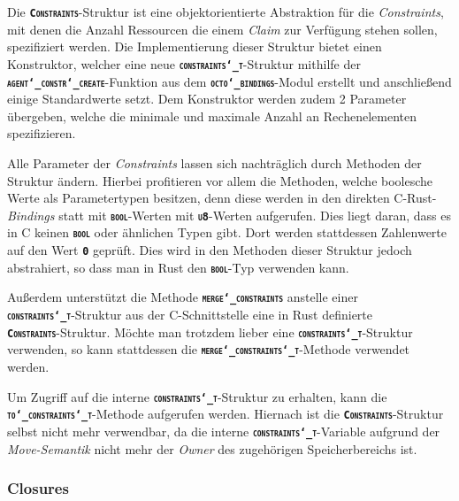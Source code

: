 Die \texttt{\textsc{\textbf{Constraints}}}-Struktur ist eine
objektorientierte Abstraktion für die \textit{Constraints}, mit denen die Anzahl Ressourcen
die einem \textit{Claim} zur Verfügung stehen sollen, spezifiziert werden.
Die Implementierung dieser Struktur bietet einen Konstruktor, welcher eine neue
\texttt{\textsc{\textbf{constraints\char`_t}}}-Struktur mithilfe der
\texttt{\textsc{\textbf{agent\char`_constr\char`_create}}}-Funktion aus dem
\texttt{\textsc{\textbf{octo\char`_bindings}}}-Modul erstellt und anschließend einige Standardwerte setzt. 
Dem Konstruktor werden zudem 2 Parameter übergeben,
welche die minimale und maximale Anzahl an Rechenelementen spezifizieren.

Alle Parameter der \textit{Constraints} lassen sich nachträglich durch Methoden der Struktur ändern.
Hierbei profitieren vor allem die Methoden, welche boolesche Werte als Parametertypen besitzen,
denn diese werden in den direkten C-Rust-\textit{Bindings} statt mit \texttt{\textsc{\textbf{bool}}}-Werten mit
\texttt{\textsc{\textbf{u8}}}-Werten aufgerufen. Dies liegt daran, dass es in C keinen
\texttt{\textsc{\textbf{bool}}} oder ähnlichen Typen gibt. Dort werden stattdessen Zahlenwerte auf den
Wert \texttt{\textsc{\textbf{0}}} geprüft. Dies wird in den Methoden dieser Struktur jedoch abstrahiert,
so dass man in Rust den \texttt{\textsc{\textbf{bool}}}-Typ verwenden kann.

Außerdem unterstützt die Methode \texttt{\textsc{\textbf{merge\char`_constraints}}} anstelle einer \\
\texttt{\textsc{\textbf{constraints\char`_t}}}-Struktur aus der C-Schnittstelle eine in Rust definierte \\
\texttt{\textsc{\textbf{Constraints}}}-Struktur. Möchte man trotzdem lieber eine
\texttt{\textsc{\textbf{constraints\char`_t}}}-Struktur verwenden, so kann stattdessen die
\texttt{\textsc{\textbf{merge\char`_constraints\char`_t}}}-Methode verwendet werden.

Um Zugriff auf die interne \texttt{\textsc{\textbf{constraints\char`_t}}}-Struktur zu erhalten, kann die \\
\texttt{\textsc{\textbf{to\char`_constraints\char`_t}}}-Methode aufgerufen werden.
Hiernach ist die \texttt{\textsc{\textbf{Constraints}}}-Struktur selbst nicht mehr verwendbar,
da die interne \texttt{\textsc{\textbf{constraints\char`_t}}}-Variable aufgrund der \textit{Move-Semantik}
nicht mehr der \textit{Owner} des zugehörigen Speicherbereichs ist.

\subsubsection{Closures}

